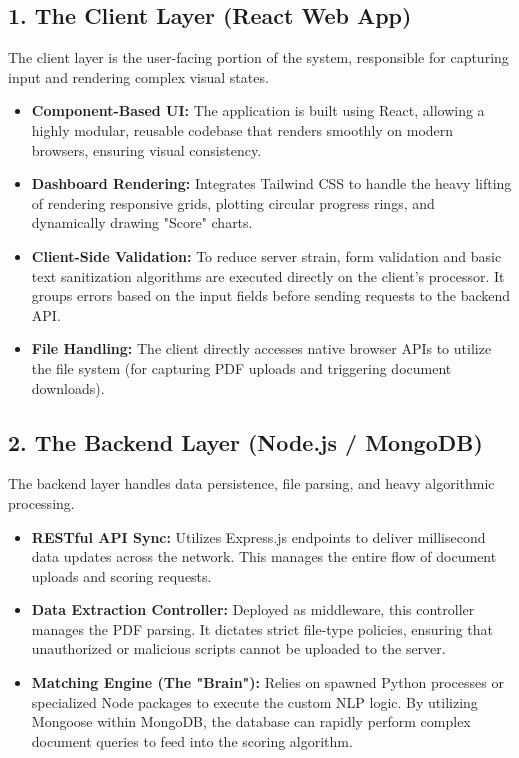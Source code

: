 \documentclass[12pt,a4paper]{report}
\begin{document}
\subsection{1. The Client Layer (React Web App)}
The client layer is the user-facing portion of the system, responsible for capturing input and rendering complex visual states.
\begin{itemize}
    \item \textbf{Component-Based UI:} The application is built using React, allowing a highly modular, reusable codebase that renders smoothly on modern browsers, ensuring visual consistency.
    \item \textbf{Dashboard Rendering:} Integrates Tailwind CSS to handle the heavy lifting of rendering responsive grids, plotting circular progress rings, and dynamically drawing "Score" charts.
    \item \textbf{Client-Side Validation:} To reduce server strain, form validation and basic text sanitization algorithms are executed directly on the client's processor. It groups errors based on the input fields before sending requests to the backend API.
    \item \textbf{File Handling:} The client directly accesses native browser APIs to utilize the file system (for capturing PDF uploads and triggering document downloads).
\end{itemize}

\subsection{2. The Backend Layer (Node.js / MongoDB)}
The backend layer handles data persistence, file parsing, and heavy algorithmic processing.
\begin{itemize}
    \item \textbf{RESTful API Sync:} Utilizes Express.js endpoints to deliver millisecond data updates across the network. This manages the entire flow of document uploads and scoring requests.
    \item \textbf{Data Extraction Controller:} Deployed as middleware, this controller manages the PDF parsing. It dictates strict file-type policies, ensuring that unauthorized or malicious scripts cannot be uploaded to the server.
    \item \textbf{Matching Engine (The "Brain"):} Relies on spawned Python processes or specialized Node packages to execute the custom NLP logic. By utilizing Mongoose within MongoDB, the database can rapidly perform complex document queries to feed into the scoring algorithm.
\end{itemize}
\end{document}
